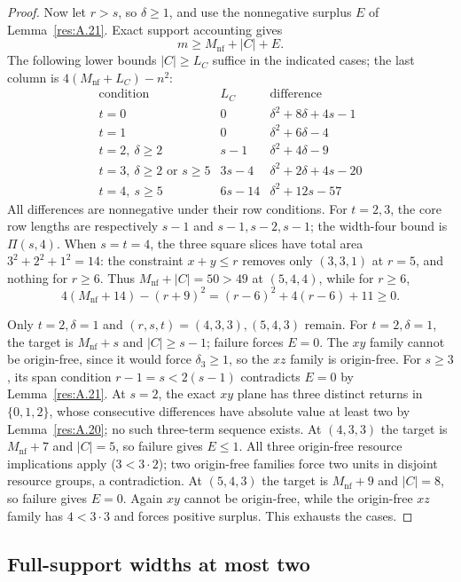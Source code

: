 \documentclass[11pt]{article}
\theoremstyle{definition}
\theoremstyle{remark}
\theoremstyle{plain}
\begin{document}
\begin{proof}
Now let $r>s$, so $\delta\ge1$, and use the nonnegative surplus $E$ of
Lemma~\ref{res:A.21}.  Exact support accounting gives
\[
 m\ge M_{\mathrm{nf}}+|C|+E.\tag{3.9}\label{eq:capacity-9}
\]
The following lower bounds $|C|\ge L_C$ suffice in the indicated cases;
the last column is $4(M_{\mathrm{nf}}+L_C)-n^2$:
\[
\begin{array}{c|c|c}
 \text{condition}&L_C&\text{difference}\\\hline
 t=0&0&\delta^2+8\delta+4s-1\\
 t=1&0&\delta^2+6\delta-4\\
 t=2,\ \delta\ge2&s-1&\delta^2+4\delta-9\\
 t=3,\ \delta\ge2\text{ or }s\ge5&3s-4&\delta^2+2\delta+4s-20\\
 t=4,\ s\ge5&6s-14&\delta^2+12s-57
\end{array}
\]
All differences are nonnegative under their row conditions.
For $t=2,3$, the core row lengths are respectively $s-1$ and
$s-1,s-2,s-1$; the width-four bound is $\Pi(s,4)$.
When $s=t=4$, the three square slices have total area
$3^2+2^2+1^2=14$: the constraint $x+y\le r$ removes only
$(3,3,1)$ at $r=5$, and nothing for $r\ge6$.
Thus $M_{\mathrm{nf}}+|C|=50>49$ at $(5,4,4)$, while for $r\ge6$,
\[
 4(M_{\mathrm{nf}}+14)-(r+9)^2=(r-6)^2+4(r-6)+11\ge0.
\]

Only $t=2,\delta=1$ and $(r,s,t)=(4,3,3),(5,4,3)$ remain.
For $t=2,\delta=1$, the target is $M_{\mathrm{nf}}+s$ and $|C|\ge s-1$;
failure forces $E=0$.  The $xy$ family cannot be origin-free,
since it would force $\delta_3\ge1$, so the $xz$ family is origin-free.
For $s\ge3$, its span condition $r-1=s<2(s-1)$ contradicts $E=0$
by Lemma~\ref{res:A.21}.  At $s=2$, the exact $xy$ plane has three distinct
returns in $\{0,1,2\}$, whose consecutive differences have absolute
value at least two by Lemma~\ref{res:A.20}; no such three-term sequence exists.
At $(4,3,3)$ the target is $M_{\mathrm{nf}}+7$ and $|C|=5$, so failure gives
$E\le1$.  All three origin-free resource implications apply
($3<3\cdot2$); two origin-free families force two units in disjoint
resource groups, a contradiction.
At $(5,4,3)$ the target is $M_{\mathrm{nf}}+9$ and $|C|=8$, so failure gives $E=0$.
Again $xy$ cannot be origin-free, while the origin-free $xz$ family
has $4<3\cdot3$ and forces positive surplus.
This exhausts the cases. \end{proof}

\subsection{Full-support widths at most two}
\end{document}
